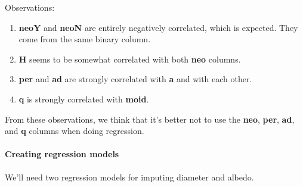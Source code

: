 \documentclass[
]{article}
\newenvironment{Shaded}{\begin{snugshade}}{\end{snugshade}}
\newcommand{\AttributeTok}[1]{\textcolor[rgb]{0.13,0.29,0.53}{#1}}
\newcommand{\FunctionTok}[1]{\textcolor[rgb]{0.13,0.29,0.53}{\textbf{#1}}}
\newcommand{\NormalTok}[1]{#1}
\newcommand{\OtherTok}[1]{\textcolor[rgb]{0.56,0.35,0.01}{#1}}
\newcommand{\SpecialCharTok}[1]{\textcolor[rgb]{0.81,0.36,0.00}{\textbf{#1}}}
\begin{document}
Observations:

\begin{enumerate}
\def\labelenumi{\arabic{enumi}.}
\item
  \textbf{neoY} and \textbf{neoN} are entirely negatively correlated,
  which is expected. They come from the same binary column.
\item
  \textbf{H} seems to be somewhat correlated with both \textbf{neo}
  columns.
\item
  \textbf{per} and \textbf{ad} are strongly correlated with \textbf{a}
  and with each other.
\item
  \textbf{q} is strongly correlated with \textbf{moid}.
\end{enumerate}

From these observations, we think that it's better not to use the
\textbf{neo}, \textbf{per}, \textbf{ad}, and \textbf{q} columns when
doing regression.

\hypertarget{creating-regression-models}{%
\paragraph{Creating regression
models}\label{creating-regression-models}}

We'll need two regression models for imputing diameter and albedo.

\begin{Shaded}
\end{Shaded}
\end{document}
